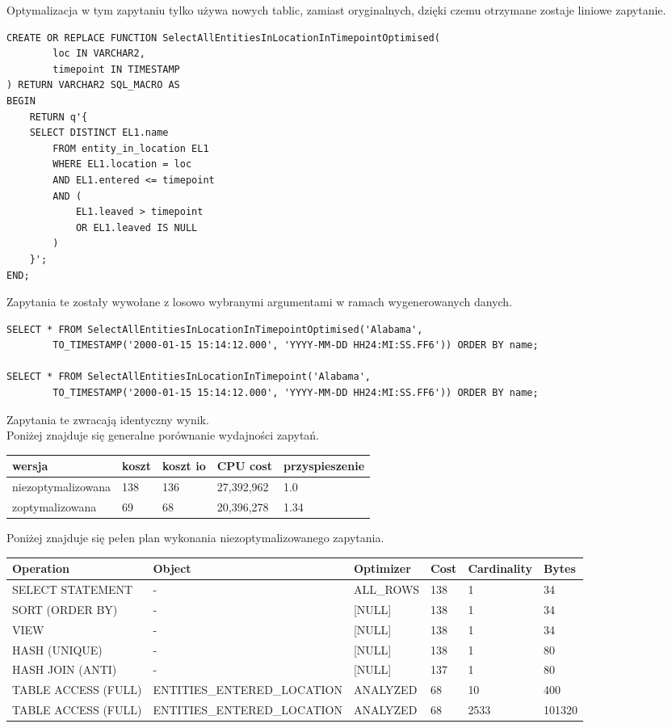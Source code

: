 \documentclass[11pt]{article}
\numberwithin{figure}{subsection}
\begin{document}
		Optymalizacja w tym zapytaniu tylko używa nowych tablic, zamiast
		oryginalnych, dzięki czemu otrzymane zostaje liniowe zapytanie.
		
		\begin{lstlisting}[caption={Wersja zoptymalizowana}, captionpos=b]
CREATE OR REPLACE FUNCTION SelectAllEntitiesInLocationInTimepointOptimised(
		loc IN VARCHAR2,
		timepoint IN TIMESTAMP
) RETURN VARCHAR2 SQL_MACRO AS
BEGIN
	RETURN q'{
	SELECT DISTINCT EL1.name
		FROM entity_in_location EL1
		WHERE EL1.location = loc
		AND EL1.entered <= timepoint
		AND (
			EL1.leaved > timepoint
			OR EL1.leaved IS NULL
		)
	}';
END;
		\end{lstlisting}
		
		Zapytania te zostały wywołane z losowo wybranymi argumentami w ramach
		wygenerowanych danych. \\
		
		\begin{lstlisting}[caption={Wywołanie zapytań}, captionpos=b]
SELECT * FROM SelectAllEntitiesInLocationInTimepointOptimised('Alabama',
		TO_TIMESTAMP('2000-01-15 15:14:12.000', 'YYYY-MM-DD HH24:MI:SS.FF6')) ORDER BY name;

SELECT * FROM SelectAllEntitiesInLocationInTimepoint('Alabama',
		TO_TIMESTAMP('2000-01-15 15:14:12.000', 'YYYY-MM-DD HH24:MI:SS.FF6')) ORDER BY name;
		\end{lstlisting}
		
		Zapytania te zwracają identyczny wynik.
		\\
		Poniżej znajduje się generalne porównanie wydajności zapytań. 
		\\
		
		\begin{tabularx}{\textwidth}{|X|X|X|X|X|}
			\hline
			wersja & koszt & koszt io & CPU cost & przyspieszenie \\
			\hline
			niezoptymalizowana & 138 & 136 & 27,392,962 & 1.0 \\
			\hline
			zoptymalizowana & 69 & 68 & 20,396,278 & 1.34 \\
			\hline
		\end{tabularx}
		
		Poniżej znajduje się pełen plan wykonania niezoptymalizowanego
		zapytania.
		\\
		
		\begin{tabularx}{\textwidth}{|X|X|X|X|X|X|}
Operation&Object&Optimizer&Cost&Cardinality&Bytes\\\hline
SELECT STATEMENT & - & ALL\_ROWS&138&1&34\\\hline
SORT (ORDER BY) & - & [NULL]&138&1&34\\\hline
VIEW & - & [NULL]&138&1&34\\\hline
HASH (UNIQUE) & - & [NULL]&138&1&80\\\hline
HASH JOIN (ANTI) & - & [NULL]&137&1&80\\\hline
TABLE ACCESS (FULL)&ENTITIES\_ENTERED\_LOCATION&ANALYZED&68&10&400\\\hline
TABLE ACCESS (FULL)&ENTITIES\_ENTERED\_LOCATION&ANALYZED&68&2533&101320\\\hline
		\end{tabularx}
		
\end{document}
